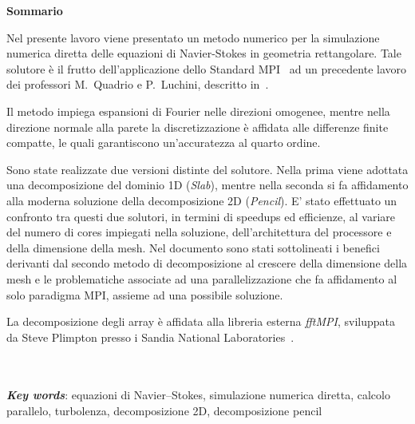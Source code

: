\documentclass[a4paper,twosides,openright,titlepage]{book}
\newenvironment{abstract}%
	{\cleardoublepage%
		\thispagestyle{empty}%
		\null \vfill\begin{center}%
		\bfseries \abstractname \end{center}}%
	{\vfill\null}
\begin{document}
\renewcommand{\abstractname}{Sommario}
\begin{abstract}
\hrulefill

Nel presente lavoro viene presentato un metodo numerico per la simulazione numerica diretta delle equazioni di Navier-Stokes in geometria rettangolare. Tale solutore è il frutto dell'applicazione dello Standard MPI~\cite{MPI} ad un precedente lavoro dei professori M.~Quadrio e P.~Luchini, descritto in~\cite{cpl:presentazione}. \par
Il metodo impiega espansioni di Fourier nelle direzioni omogenee, mentre nella direzione normale alla parete la discretizzazione è affidata alle differenze finite compatte, le quali garantiscono un'accuratezza al quarto ordine.\par
Sono state realizzate due versioni distinte del solutore. Nella prima viene adottata una decomposizione del dominio 1D (\textit{Slab}), mentre nella seconda si fa affidamento alla moderna soluzione della decomposizione 2D (\textit{Pencil}). 
E' stato effettuato un confronto tra questi due solutori, in termini di speedups ed efficienze, al variare del numero di cores impiegati nella soluzione, dell'architettura del processore e della dimensione della mesh. Nel documento sono stati sottolineati i benefici derivanti dal secondo metodo di decomposizione al crescere della dimensione della mesh e le problematiche associate ad una parallelizzazione che fa affidamento al solo paradigma MPI, assieme ad una possibile soluzione.\par
La decomposizione degli array è affidata alla libreria esterna \emph{fftMPI}, sviluppata da Steve Plimpton presso i Sandia National Laboratories~\cite{fftMPI}.\\~\\~\par

\textbf{\textit{Key words}}: equazioni di Navier–Stokes, simulazione numerica diretta, calcolo parallelo, turbolenza, decomposizione 2D, decomposizione pencil

\hrulefill
\end{abstract}
\end{document}
